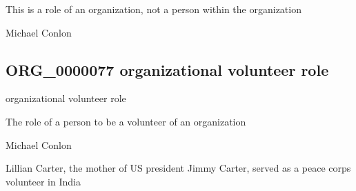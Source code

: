 \documentclass[letterpaper,10pt,english]{sphinxmanual}
\begin{document}
\begin{sphinxShadowBox}

\sphinxAtStartPar
This is a role of an organization, not a person within the organization
\end{sphinxShadowBox}

\begin{sphinxShadowBox}

\sphinxAtStartPar
Michael Conlon 
\end{sphinxShadowBox}
\begin{quote}

\ignorespaces \end{quote}


\subsection{ORG\_0000077 \sphinxhyphen{} organizational volunteer role}
\label{\detokenize{doc-ORG_0000077:org-0000077-organizational-volunteer-role}}\label{\detokenize{doc-ORG_0000077:index-0}}\label{\detokenize{doc-ORG_0000077::doc}}
\begin{sphinxShadowBox}

\sphinxAtStartPar
organizational volunteer role
\end{sphinxShadowBox}

\begin{sphinxShadowBox}

\sphinxAtStartPar
The role of a person to be a volunteer of an organization
\end{sphinxShadowBox}

\begin{sphinxShadowBox}

\sphinxAtStartPar
Michael Conlon 
\end{sphinxShadowBox}

\begin{sphinxShadowBox}

\sphinxAtStartPar
Lillian Carter, the mother of US president Jimmy Carter, served as a peace corps volunteer in India
\end{sphinxShadowBox}
\end{document}
